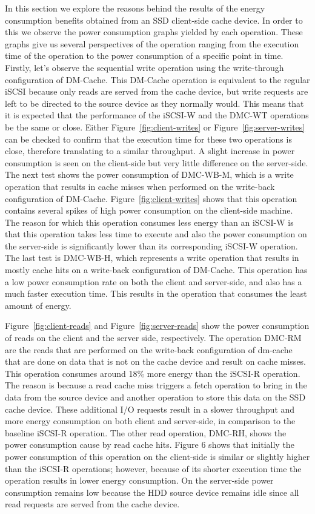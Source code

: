 In this section we explore the reasons behind the results of the energy
consumption benefits obtained from an SSD client-side cache device. In order to
this we observe the power consumption graphs yielded by each operation. These
graphs give us several perspectives of the operation ranging from the execution
time of the operation to the power consumption of a specific point in
time. Firstly, let's observe the sequential write operation using the
write-through configuration of DM-Cache. This DM-Cache operation is equivalent
to the regular iSCSI because only reads are served from the cache device, but
write requests are left to be directed to the source device as they normally
would. This means that it is expected that the performance of the iSCSI-W and
the DMC-WT operations be the same or close. Either
Figure~\ref{fig:client-writes} or Figure~\ref{fig:server-writes} can be checked
to confirm that the execution time for these two operations is close, therefore
translating to a similar throughput. A slight increase in power consumption is
seen on the client-side but very little difference on the server-side. The next
test shows the power consumption of DMC-WB-M, which is a write operation that
results in cache misses when performed on the write-back configuration of
DM-Cache. Figure~\ref{fig:client-writes} shows that this operation contains
several spikes of high power consumption on the client-side machine. The reason
for which this operation consumes less energy than an iSCSI-W is that this
operation takes less time to execute and also the power consumption on the
server-side is significantly lower than its corresponding iSCSI-W operation. The
last test is DMC-WB-H, which represents a write operation that results in mostly
cache hits on a write-back configuration of DM-Cache. This operation has a low
power consumption rate on both the client and server-side, and also has a much
faster execution time. This results in the operation that consumes the least
amount of energy.

Figure~\ref{fig:client-reads} and Figure~\ref{fig:server-reads} show the power
consumption of reads on the client and the server side, respectively. The
operation DMC-RM are the reads that are performed on the write-back
configuration of dm-cache that are done on data that is not on the cache device
and result on cache misses. This operation consumes around 18\% more energy than
the iSCSI-R operation. The reason is because a read cache miss triggers a fetch
operation to bring in the data from the source device and another operation to
store this data on the SSD cache device. These additional I/O requests result in
a slower throughput and more energy consumption on both client and server-side,
in comparison to the baseline iSCSI-R operation.  The other read operation,
DMC-RH, shows the power consumption cause by read cache hits. Figure 6 shows
that initially the power consumption of this operation on the client-side is
similar or slightly higher than the iSCSI-R operations; however, because of its
shorter execution time the operation results in lower energy consumption. On the
server-side power consumption remains low because the HDD source device remains
idle since all read requests are served from the cache device.
